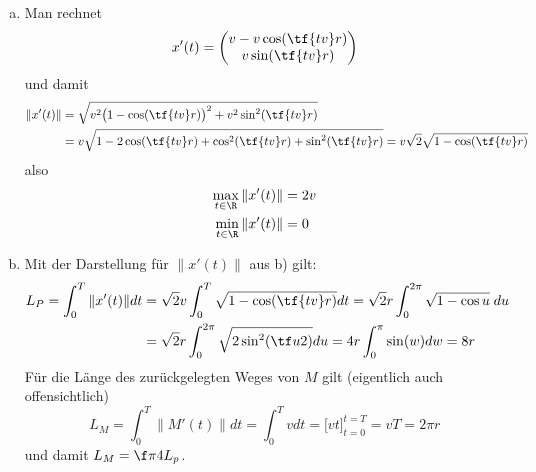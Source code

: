 \documentclass{mywork}
\begin{document}
\begin{aufgabe}
\begin{enumerate}[a)]
	\item
		Man rechnet
		\begin{align*}
			x'(t) = \begin{pmatrix}
				v- v \cos(\tf{tv}r) \\
				v \sin(\tf{tv}r)
			\end{pmatrix}
		\end{align*}
		und damit
		\begin{align*}
			\| x'(t) \|
			&= \sqrt{v^2\big(1-\cos (\tf{tv}r)\big)^2 + v^2 \sin^2(\tf{tv}r)} \\
			&= v \sqrt{1- 2 \cos (\tf{tv}r) + \cos^2 (\tf {tv}r) + \sin^2 (\tf {tv}r)} 
			= v \sqrt{2} \sqrt{1 - \cos (\tf {tv}r)}
		\end{align*}
		also
		\begin{align*}
			\max_{t\in \R} \|x'(t)\| &= 2v \\
			\min_{t\in \R} \|x'(t)\| &= 0
		\end{align*}
	\item
		Mit der Darstellung für $\|x'(t)\|$ aus b) gilt:
		\begin{align*}
			L_P = \int_0^T \|x'(t)\| dt
			&= \sqrt 2 v \int_0^T \sqrt{1 -\cos (\tf {tv}r)} dt
			= \sqrt 2 r \int_0^{2\pi} \sqrt{1 - \cos u} \; du \\
			&= \sqrt 2 r \int_0^{2\pi} \sqrt{2 \sin^2 (\tf u2)} du
			= 4 r \int_0^{\pi} \sin(w) dw 
			= 8 r
		\end{align*}
		Für die Länge des zurückgelegten Weges von $M$ gilt (eigentlich auch offensichtlich)
		\[
			L_M 
			= \int_0^T \|M'(t)\| dt 
			= \int_0^T v dt 
			= \big[ v t \big]_{t=0}^{t=T}
			= v T
			= 2 \pi r
		\]
		und damit $L_M = \f \pi 4 L_p$.
		\end{enumerate}
	\end{aufgabe}
\end{document}
